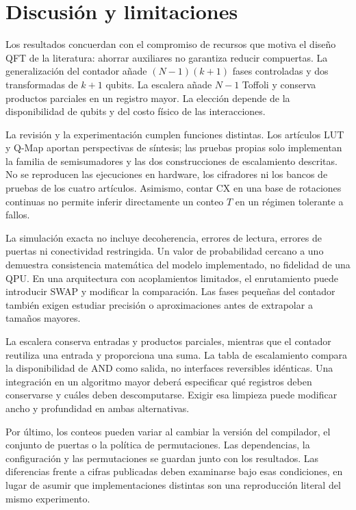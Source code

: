 \documentclass[10pt,a4paper,twocolumn]{article}
\begin{document}
\section{Discusión y limitaciones}
Los resultados concuerdan con el compromiso de recursos que motiva el diseño
QFT de la literatura: ahorrar auxiliares no garantiza reducir compuertas.
La generalización del contador añade $(N-1)(k+1)$ fases controladas y dos
transformadas de $k+1$ qubits. La escalera añade $N-1$ Toffoli y conserva
productos parciales en un registro mayor. La elección depende de la
disponibilidad de qubits y del costo físico de las interacciones.

La revisión y la experimentación cumplen funciones distintas. Los artículos
LUT y Q-Map aportan perspectivas de síntesis; las pruebas propias solo
implementan la familia de semisumadores y las dos construcciones de
escalamiento descritas. No se reproducen las ejecuciones en hardware,
los cifradores ni los bancos de pruebas de los cuatro artículos.
Asimismo, contar CX en una base de rotaciones continuas no permite inferir
directamente un conteo $T$ en un régimen tolerante a fallos.

La simulación exacta no incluye decoherencia, errores de lectura, errores
de puertas ni conectividad restringida. Un valor de probabilidad cercano
a uno demuestra consistencia matemática del modelo implementado, no
fidelidad de una QPU. En una arquitectura con acoplamientos limitados,
el enrutamiento puede introducir SWAP y modificar la comparación.
Las fases pequeñas del contador también exigen estudiar precisión o
aproximaciones antes de extrapolar a tamaños mayores.

La escalera conserva entradas y productos parciales, mientras que el contador
reutiliza una entrada y proporciona una suma. La tabla de escalamiento
compara la disponibilidad de AND como salida, no interfaces reversibles
idénticas. Una integración en un algoritmo mayor deberá especificar qué
registros deben conservarse y cuáles deben descomputarse. Exigir esa limpieza
puede modificar ancho y profundidad en ambas alternativas.

Por último, los conteos pueden variar al cambiar la versión del compilador,
el conjunto de puertas o la política de permutaciones. Las dependencias,
la configuración y las permutaciones se guardan junto con los resultados.
Las diferencias frente a cifras publicadas deben examinarse bajo esas
condiciones, en lugar de asumir que implementaciones distintas son una
reproducción literal del mismo experimento.
\end{document}
